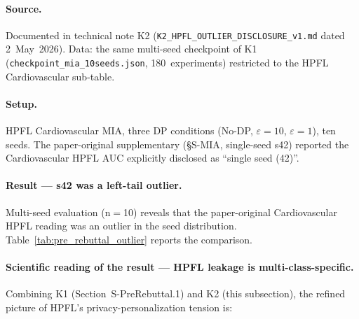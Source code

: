 \documentclass[conference]{IEEEtran}
\begin{document}
\paragraph{Source.} Documented in technical note K2 (\texttt{K2\_HPFL\_OUTLIER\_DISCLOSURE\_v1.md} dated 2~May~2026). Data: the same multi-seed checkpoint of K1 (\texttt{checkpoint\_mia\_10seeds.json}, 180~experiments) restricted to the HPFL Cardiovascular sub-table.

\paragraph{Setup.} HPFL Cardiovascular MIA, three DP conditions (No-DP, $\varepsilon{=}10$, $\varepsilon{=}1$), ten seeds. The paper-original supplementary (§S-MIA, single-seed s42) reported the Cardiovascular HPFL AUC explicitly disclosed as ``single seed (42)''.

\paragraph{Result --- s42 was a left-tail outlier.} Multi-seed evaluation (n$=$10) reveals that the paper-original Cardiovascular HPFL reading was an outlier in the seed distribution. Table~\ref{tab:pre_rebuttal_outlier} reports the comparison.

\begin{table}[htbp]
\centering
\caption{HPFL Cardiovascular MIA: paper-original single-seed (s42) vs.\ multi-seed mean (n$=$10). The s42 reading falls approximately $-$1.1 std below the multi-seed mean, consistent with a left-tail outlier.}
\label{tab:pre_rebuttal_outlier}
\small
{}
\end{table}

\paragraph{Scientific reading of the result --- HPFL leakage is multi-class-specific.} Combining K1 (Section~S-PreRebuttal.1) and K2 (this subsection), the refined picture of HPFL's privacy-personalization tension is:
\end{document}
